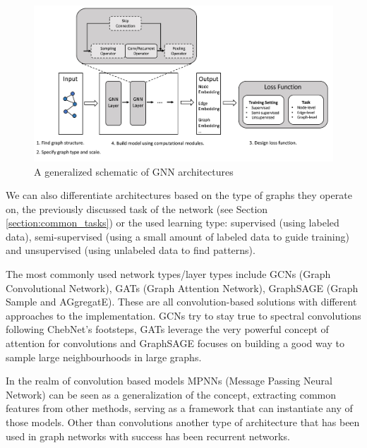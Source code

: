	 \begin{figure}[!h]
	 	\centering
	 	\includegraphics[width=\textwidth]{figures/gnn_general_structure.jpg}
	 	\caption{A generalized schematic of GNN architectures \cite{gnn_review}}
	 \end{figure}
	 
	 We can also differentiate architectures based on the type of graphs they operate on, the previously discussed task of the network (see Section \ref{section:common_tasks}) or the used learning type: supervised (using labeled data), semi-supervised (using a small amount of labeled data to guide training) and unsupervised (using unlabeled data to find patterns).
	 
	 The most commonly used network types/layer types include GCNs \cite{kipf2016semi} (Graph Convolutional Network), GATs \cite{gat_paper} (Graph Attention Network), GraphSAGE \cite{graphasge_paper} (Graph Sample and AGgregatE). These are all convolution-based solutions with different approaches to the implementation. GCNs try to stay true to spectral convolutions following ChebNet's footsteps, GATs leverage the very powerful concept of attention for convolutions and GraphSAGE focuses on building a good way to sample large neighbourhoods in large graphs.
	 
	 In the realm of convolution based models MPNNs\cite{gilmer2020message} (Message Passing Neural Network) can be seen as a generalization of the concept, extracting common features from other methods, serving as a framework that can instantiate any of those models. Other than convolutions another type of architecture that has been used in graph networks with success has been recurrent networks. 
	 
